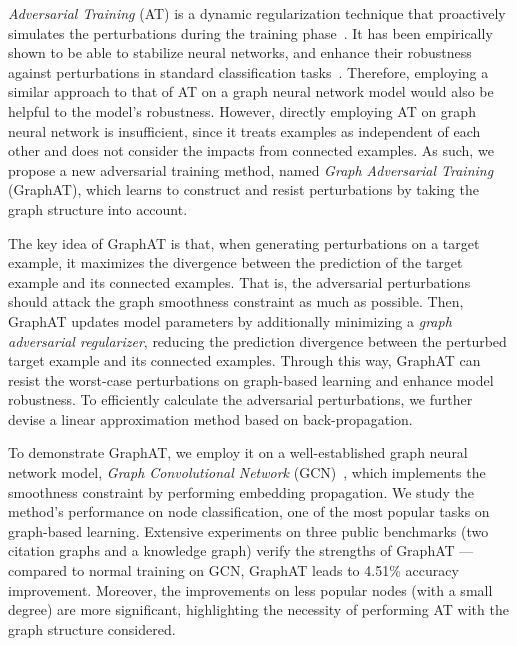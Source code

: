 \documentclass[10pt,journal,compsoc]{IEEEtran}
\begin{document}
\textit{Adversarial Training} (AT) is a dynamic regularization technique that proactively simulates the perturbations during the training phase~\cite{goodfellow2015explaining}. It has been empirically shown to be able to stabilize neural networks, and enhance their robustness against perturbations in standard classification tasks~\cite{kurakin2016adversarial,miyato2016adversarial,Feng2019Enhancing,liu2019generative,Wang2019ASR,tang2019adversarial}. Therefore, employing a similar approach to that of AT on a graph neural network model would also be helpful to the model's robustness. 
However, directly employing AT on graph neural network is insufficient, since it treats examples as independent of each other and does not consider the impacts from connected examples. 
As such, we propose a new adversarial training method, named \textit{Graph Adversarial Training} (GraphAT), which learns to construct and resist perturbations by taking the graph structure into account.  






The key idea of GraphAT is that, when generating perturbations on a target example, it maximizes the divergence between the prediction of the target example and its connected examples. 
That is, the adversarial perturbations should attack the graph smoothness constraint as much as possible. 
Then, GraphAT updates model parameters by additionally minimizing a \textit{graph adversarial regularizer}, reducing the prediction divergence between the perturbed target example and its connected examples.
Through this way, GraphAT can resist the worst-case perturbations on graph-based learning and enhance model robustness. 
To efficiently calculate the adversarial perturbations, we further devise a linear approximation method based on back-propagation. 

To demonstrate GraphAT, we employ it on a well-established graph neural network model, \textit{Graph Convolutional Network} (GCN)~\cite{kipf2017semi}, which implements the smoothness constraint by performing embedding propagation. We study the method's performance on node classification, one of the most popular tasks on graph-based learning. Extensive experiments on three public benchmarks (two citation graphs and a knowledge graph) verify the strengths of GraphAT --- compared to normal training on GCN, GraphAT leads to 4.51\% accuracy improvement. Moreover, the improvements on less popular nodes (with a small degree) are more significant, highlighting the necessity of performing AT with the graph structure considered.
\end{document}
